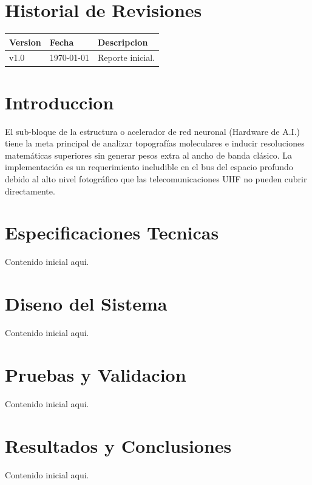 \documentclass[a4paper, twoside, 12pt]{report}
\begin{document}

\begin{abstract}
    Escribe aqui el resumen ejecutivo del reporte.
\end{abstract}

\chapter*{Historial de Revisiones}
\begin{center}
\begin{tabular}{p{2cm} p{3cm} p{9cm}}
\toprule
\textbf{Version} & \textbf{Fecha} & \textbf{Descripcion} \\
\midrule
v1.0 & \today & Reporte inicial. \\
\bottomrule
\end{tabular}
\end{center}

\clearpage
\tableofcontents
\listoffigures
\listoftables
\clearpage


\chapter{Introduccion}
El sub-bloque de la estructura o acelerador de red neuronal (Hardware de A.I.) tiene la meta principal de analizar topografías moleculares e inducir resoluciones matemáticas superiores sin generar pesos extra al ancho de banda clásico. La implementación es un requerimiento ineludible en el bus del espacio profundo debido al alto nivel fotográfico que las telecomunicaciones UHF no pueden cubrir directamente.

\chapter{Especificaciones Tecnicas}
Contenido inicial aqui.

\chapter{Diseno del Sistema}
Contenido inicial aqui.

\chapter{Pruebas y Validacion}
Contenido inicial aqui.

\chapter{Resultados y Conclusiones}
Contenido inicial aqui.

% 
% 
\end{document}

